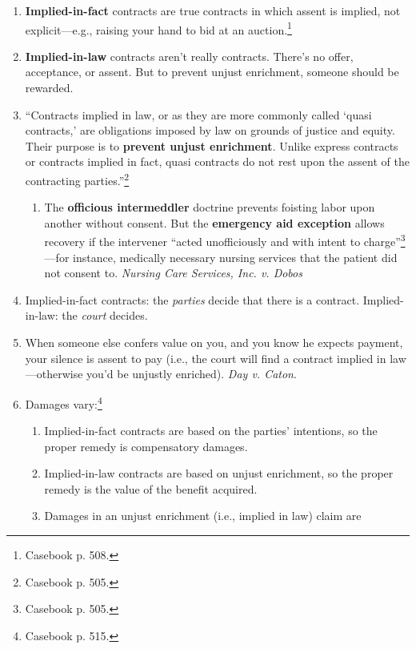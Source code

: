 \begin{enumerate}
    \item \textbf{Implied-in-fact} contracts are true contracts in which 
    assent is implied, not explicit---e.g., raising your hand to bid at an 
    auction.\footnote{Casebook p. 508.}
    \item \textbf{Implied-in-law} contracts aren't really contracts. There's 
    no offer, acceptance, or assent. But to prevent unjust enrichment, someone 
    should be rewarded.
    \item ``Contracts implied in law, or as they are more commonly called 
    `quasi contracts,' are obligations imposed by law on grounds of justice 
    and equity. Their purpose is to \textbf{prevent unjust enrichment}. Unlike 
    express contracts or contracts implied in fact, quasi contracts do not 
    rest upon the assent of the contracting parties.''\footnote{Casebook p.  
    505.}
    \begin{enumerate}
        \item The \textbf{officious intermeddler} doctrine prevents foisting 
        labor upon another without consent. But the \textbf{emergency aid 
        exception} allows recovery if the intervener ``acted unofficiously and 
        with intent to charge''\footnote{Casebook p. 505.}---for instance, 
        medically necessary nursing services that the patient did not consent 
        to. \emph{Nursing Care Services, Inc. v. Dobos}
    \end{enumerate}
    \item Implied-in-fact contracts: the \emph{parties} decide that there is 
    a contract. Implied-in-law: the \emph{court} decides.
    \item When someone else confers value on you, and you know he expects 
    payment, your silence is assent to pay (i.e., the court will find a 
    contract implied in law---otherwise you'd be unjustly enriched). \emph{Day 
    v. Caton}.
    \item Damages vary:\footnote{Casebook p. 515.}
    \begin{enumerate}
        \item Implied-in-fact contracts are based on the parties' intentions, 
        so the proper remedy is compensatory damages.
        \item Implied-in-law contracts are based on unjust enrichment, so the 
        proper remedy is the value of the benefit acquired.
        \item Damages in an unjust enrichment (i.e., implied in law) claim are 

\end{enumerate}
\end{enumerate}
